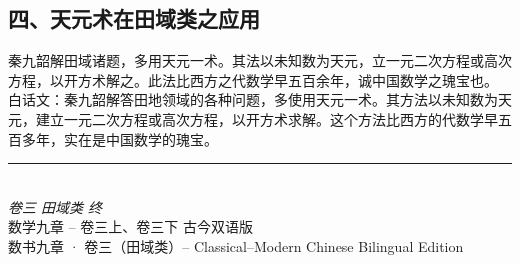 \documentclass[11pt,a4paper]{article}
\newcommand{\origtext}[1]{{\color{origcolor}#1}}
\newcommand{\modtext}[1]{{\color{modcolor}#1}}
\begin{document}
\subsection*{\color{origcolor}四、天元术在田域类之应用}

\origtext{秦九韶解田域诸题，多用天元一术。其法以未知数为天元，立一元二次方程或高次方程，以开方术解之。此法比西方之代数学早五百余年，诚中国数学之瑰宝也。}
\modtext{白话文：秦九韶解答田地领域的各种问题，多使用天元一术。其方法以未知数为天元，建立一元二次方程或高次方程，以开方术求解。这个方法比西方的代数学早五百多年，实在是中国数学的瑰宝。}

\vspace{1cm}

\begin{center}
{\color{rulecolor}\rule{8cm}{0.4pt}}\\[0.5cm]
{\small\color{origcolor}\textit{卷三 田域类 终}}\\[0.3cm]
{\small\color{modcolor} 数学九章 -- 卷三上、卷三下 古今双语版}\\[0.3cm]
{\small\color{origcolor}数书九章 · 卷三（田域类）-- Classical--Modern Chinese Bilingual Edition}
\end{center}
\end{document}
